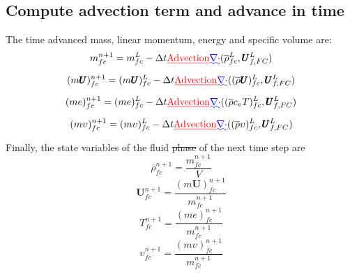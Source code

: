 \documentclass[preprint,12pt]{elsarticle}
\providecommand{\DIFadd}[1]{{\protect\color{blue}\uwave{#1}}} %
\providecommand{\DIFdel}[1]{{\protect\color{red}\sout{#1}}}                      %
\providecommand{\DIFaddbegin}{} %
\providecommand{\DIFaddend}{} %
\providecommand{\DIFdelbegin}{} %
\providecommand{\DIFdelend}{} %
\newcommand{\DIFscaledelfig}{0.5}
\newlength{\DIFdelgraphicswidth} %
\newlength{\DIFdelgraphicsheight} %
\newcommand{\DIFaddincludegraphics}[2][]{{\color{blue}\fbox{\DIFOincludegraphics[#1]{#2}}}} %
\newcommand{\DIFdelincludegraphics}[2][]{%
\sbox{\DIFdelgraphicsbox}{\DIFOincludegraphics[#1]{#2}}%
\settoboxwidth{\DIFdelgraphicswidth}{\DIFdelgraphicsbox} %
\settoboxtotalheight{\DIFdelgraphicsheight}{\DIFdelgraphicsbox} %
\scalebox{\DIFscaledelfig}{%
\parbox[b]{\DIFdelgraphicswidth}{\usebox{\DIFdelgraphicsbox}\\[-\baselineskip] \rule{\DIFdelgraphicswidth}{0em}}\llap{\resizebox{\DIFdelgraphicswidth}{\DIFdelgraphicsheight}{%
\setlength{\unitlength}{\DIFdelgraphicswidth}%
\begin{picture}(1,1)%
\thicklines\linethickness{2pt} %
{\color[rgb]{1,0,0}\put(0,0){\framebox(1,1){}}}%
{\color[rgb]{1,0,0}\put(0,0){\line( 1,1){1}}}%
{\color[rgb]{1,0,0}\put(0,1){\line(1,-1){1}}}%
\end{picture}%
}\hspace*{3pt}}} %
} %
\DeclareRobustCommand{\DIFaddbegin}{\DIFOaddbegin \let\includegraphics\DIFaddincludegraphics} %
\DeclareRobustCommand{\DIFaddend}{\DIFOaddend \let\includegraphics\DIFOincludegraphics} %
\DeclareRobustCommand{\DIFdelbegin}{\DIFOdelbegin \let\includegraphics\DIFdelincludegraphics} %
\DeclareRobustCommand{\DIFdelend}{\DIFOaddend \let\includegraphics\DIFOincludegraphics} %
\begin{document}
\subsection{\textsf{Compute advection term and advance in time}}
The time advanced mass, linear momentum, energy and specific volume are:
%
%
\begin{equation}
 m_{fc}^{n+1} = m_{fc}^L - \delt  \DIFdelbegin \DIFdel{\text{Advection}}\DIFdelend \DIFaddbegin \DIFadd{\nabla \cdot }\DIFaddend (\overline{\rho}_{fc}^L,\pmb{U}_{f,FC}^{L})
\end{equation}
%
%
\begin{equation}
 (m \pmb{U})_{fc}^{n+1} = (m \pmb{U})_{fc}^L - \delt  \DIFdelbegin \DIFdel{\text{Advection}}\DIFdelend \DIFaddbegin \DIFadd{\nabla \cdot }\DIFaddend ((\overline{\rho} \pmb{U})_{fc}^L,\pmb{U}_{f,FC}^{L})
\end{equation}
%
%
\begin{equation}
 (me)_{fc}^{n+1} = (me)_{fc}^L - \delt  \DIFdelbegin \DIFdel{\text{Advection}}\DIFdelend \DIFaddbegin \DIFadd{\nabla \cdot }\DIFaddend ((\overline{\rho} c_v T)_{fc}^L,\pmb{U}_{f,FC}^{L})
\end{equation}
%
%
\begin{equation}
 (m \upsilon)_{fc}^{n+1} = (m \upsilon)_{fc}^L - \delt  \DIFdelbegin \DIFdel{\text{Advection}}\DIFdelend \DIFaddbegin \DIFadd{\nabla \cdot }\DIFaddend ((\overline{\rho} \upsilon)_{fc}^L,\pmb{U}_{f,FC}^{L})
\end{equation}
%
%
Finally, the state variables of the fluid \DIFdelbegin \DIFdel{phase }\DIFdelend \DIFaddbegin \DIFadd{phases }\DIFaddend of the next time step are
%
%
\begin{equation}
\overline{\rho}_{fc}^{n+1} = \frac{m_{fc}^{n+1}} {V}
\end{equation}
%
%
\begin{equation}
 \pmb{U}_{fc}^{n+1} = \frac{(m \pmb{U})_{fc}^{n+1}}{m_{fc}^{n+1}} 
\end{equation}
%
%
\begin{equation}
 T_{fc}^{n+1} = \frac{(me)_{fc}^{n+1}}{m_{fc}^{n+1}}
\end{equation}
%
%
\begin{equation}
 \upsilon_{fc}^{n+1} = \frac{(m \upsilon)_{fc}^{n+1}}{m_{fc}^{n+1}}
\end{equation}
%
%
\end{document}
